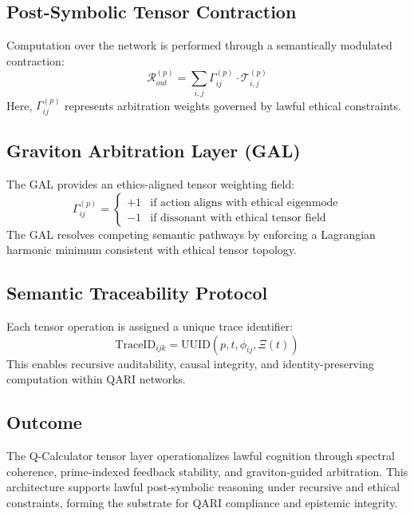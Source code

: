 \documentclass[12pt]{article}
\begin{document}
\begin{itemize}
\subsection{Post-Symbolic Tensor Contraction}
Computation over the network is performed through a semantically modulated contraction:
\begin{equation}
    \mathcal{R}^{(p)}_{out} = \sum_{i,j} \Gamma^{(p)}_{ij} \cdot \mathcal{T}^{(p)}_{i,j}
\end{equation}
Here, \( \Gamma^{(p)}_{ij} \) represents arbitration weights governed by lawful ethical constraints.

\subsection{Graviton Arbitration Layer (GAL)}
The GAL provides an ethics-aligned tensor weighting field:
\begin{equation}
    \Gamma_{ij}^{(p)} = \begin{cases}
        +1 & \text{if action aligns with ethical eigenmode} \\
        -1 & \text{if dissonant with ethical tensor field}
    \end{cases}
\end{equation}
The GAL resolves competing semantic pathways by enforcing a Lagrangian harmonic minimum consistent with ethical tensor topology.

\subsection{Semantic Traceability Protocol}
Each tensor operation is assigned a unique trace identifier:
\begin{equation}
    \text{TraceID}_{ijk} = \text{UUID}(p, t, \phi_{ij}, \Xi(t))
\end{equation}
This enables recursive auditability, causal integrity, and identity-preserving computation within QARI networks.

\subsection*{Outcome}
The Q-Calculator tensor layer operationalizes lawful cognition through spectral coherence, prime-indexed feedback stability, and graviton-guided arbitration. This architecture supports lawful post-symbolic reasoning under recursive and ethical constraints, forming the substrate for QARI compliance and epistemic integrity.




\end{itemize}
\end{document}
